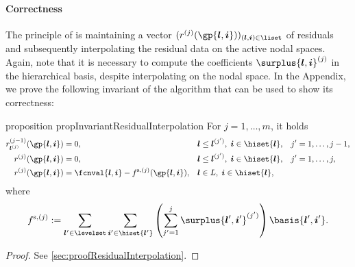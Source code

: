 \paragraph{Correctness}

The principle of  is maintaining
a vector $(r^{(j)}(\gp{\*l,\*i}))_{(\*l,\*i) \in \liset}$ of residuals
and subsequently interpolating the residual data on the active nodal spaces.
Again, note that it is necessary to compute the coefficients
$\surplus{\*l,\*i}^{(j)}$ in the hierarchical basis, despite interpolating
on the nodal space.
In the Appendix, we prove the following invariant of the algorithm that
can be used to show its correctness:

\begin{restatable}{%
  proposition%
}{%
  propInvariantResidualInterpolation%
}
  \label{prop:invariantResidualInterpolation}
  For $j = 1, \dotsc, m$, it holds
  \begin{subequations}
    \label{eq:propInvariantResidualInterpolationStatements}
    \begin{align}
      \label{eq:propInvariantResidualInterpolation1}
      r_{\*l^{(j)}}^{(j-1)}(\gp{\*l,\*i})
      &= 0,
      &&\*l \le \*l^{(j')},\; \*i \in \hiset{\*l},
      &j'
      &= 1, \dotsc, j - 1,\\
      \label{eq:propInvariantResidualInterpolation2}
      r^{(j)}(\gp{\*l,\*i})
      &= 0,
      &&\*l \le \*l^{(j')},\; \*i \in \hiset{\*l},
      &j'
      &= 1, \dotsc, j,\\
      \label{eq:propInvariantResidualInterpolation3}
      r^{(j)}(\gp{\*l,\*i})
      &= \fcnval{\*l,\*i} - f^{\sparse,(j)}(\gp{\*l,\*i}),
      &&\*l \in L,\; \*i \in \hiset{\*l},&&
    \end{align}
  \end{subequations}
  where
  \begin{equation}
    \label{eq:propInvariantResidualInterpolation4}
    f^{\sparse,(j)}
    := \sum_{\*l' \in \levelset} \sum_{\*i' \in \hiset{\*l'}}
    \left(\sum_{j'=1}^{j} \surplus{\*l',\*i'}^{(j')}\right) \basis{\*l',\*i'}.
  \end{equation}
\end{restatable}

\begin{proof}
  See \cref{sec:proofResidualInterpolation}.
\end{proof}

